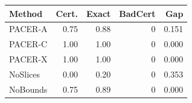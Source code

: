 \begin{tabular}{lrrrr}
\toprule
Method & Cert. & Exact & BadCert & Gap\\
\midrule
PACER-A & 0.75 & 0.88 & 0 & 0.151\\
PACER-C & 1.00 & 1.00 & 0 & 0.000\\
PACER-X & 1.00 & 1.00 & 0 & 0.000\\
NoSlices & 0.00 & 0.20 & 0 & 0.353\\
NoBounds & 0.75 & 0.89 & 0 & 0.000\\
\bottomrule
\end{tabular}
